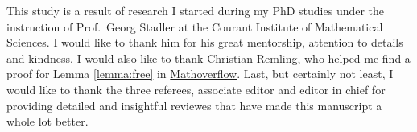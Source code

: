 This study is a result of research I started during my PhD studies
under the instruction of Prof.~Georg Stadler at the Courant Institute
of Mathematical Sciences. I would like to thank him for his great
mentorship, attention to details and kindness. I would also like to
thank Christian Remling, who helped me find a proof for Lemma
\ref{lemma:free} in
\href{https://mathoverflow.net/questions/280168/redistribute-diagonal-entries-of-a-matrix/280203#280203c}{Mathoverflow}.
Last, but certainly not least, I would like to thank the three
referees, associate editor and editor in chief for providing detailed
and insightful reviewes that have made this manuscript a whole lot
better.
